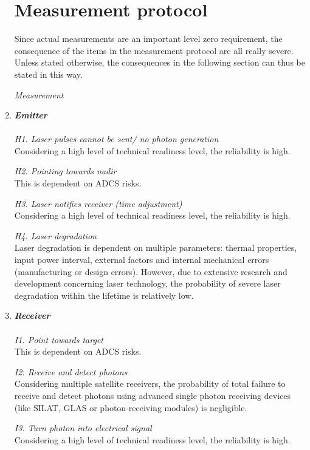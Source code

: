 \begin{enumerate}[A]
\section{Measurement protocol}
\label{blTRAMp}
Since actual measurements are an important level zero requirement, the consequence of the items in the measurement protocol are all really severe. Unless stated otherwise, the consequences in the following section can thus be stated in this way.

\begin{description}
\item[\textit{Measurement}]
\end{description}
	\item\textbf{\textit{Emitter}} \\\\
\textit{H1. Laser pulses cannot be sent/ no photon generation}\\ Considering a high level of technical readiness level, the reliability is high.

\textit{H2. Pointing towards nadir}\\
This is dependent on ADCS risks.

\textit{H3. Laser notifies receiver (time adjustment)}\\ 
Considering a high level of technical readiness level, the reliability is high.

\textit{H4. Laser degradation}\\
Laser degradation is dependent on multiple parameters: thermal properties, input power interval, external factors and internal mechanical errors (manufacturing or design errors). However, due to extensive research and development concerning laser technology, the probability of severe laser degradation within the lifetime is relatively low. 

	\item\textbf{\textit{Receiver}} \\\\
\textit{I1. Point towards target} \\
This is dependent on ADCS risks.

\textit{I2. Receive and detect photons}\\ 
Considering multiple satellite receivers, the probability of total failure to receive and detect photons using advanced single photon receiving devices (like SILAT, \ac{GLAS} or photon-receiving modules) is negligible. 

\textit{I3. Turn photon into electrical signal}\\ 
Considering a high level of technical readiness level, the reliability is high.


\end{enumerate}
